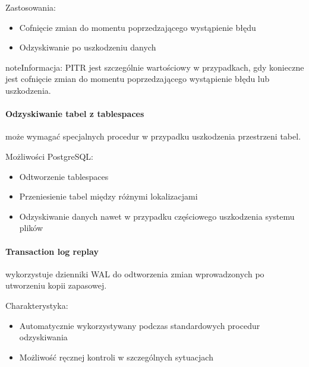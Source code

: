 \documentclass[letterpaper,10pt,polish]{sphinxmanual}
\begin{document}
\sphinxAtStartPar
Zastosowania:
\begin{itemize}
\item {} 
\sphinxAtStartPar
Cofnięcie zmian do momentu poprzedzającego wystąpienie błędu

\item {} 
\sphinxAtStartPar
Odzyskiwanie po uszkodzeniu danych

\end{itemize}

\begin{sphinxadmonition}{note}{Informacja:}
\sphinxAtStartPar
PITR jest szczególnie wartościowy w przypadkach, gdy konieczne jest cofnięcie zmian do momentu poprzedzającego wystąpienie błędu lub uszkodzenia.
\end{sphinxadmonition}


\paragraph{Odzyskiwanie tabel z tablespaces}
\label{\detokenize{rozdzial2/Kopie_zapasowe_i_odzyskiwanie_danych/kopie_zapasowe_i_odzyskiwanie_danych:odzyskiwanie-tabel-z-tablespaces}}
\sphinxAtStartPar
{} może wymagać specjalnych procedur w przypadku uszkodzenia przestrzeni tabel.

\sphinxAtStartPar
Możliwości PostgreSQL:
\begin{itemize}
\item {} 
\sphinxAtStartPar
Odtworzenie tablespaces

\item {} 
\sphinxAtStartPar
Przeniesienie tabel między różnymi lokalizacjami

\item {} 
\sphinxAtStartPar
Odzyskiwanie danych nawet w przypadku częściowego uszkodzenia systemu plików

\end{itemize}


\paragraph{Transaction log replay}
\label{\detokenize{rozdzial2/Kopie_zapasowe_i_odzyskiwanie_danych/kopie_zapasowe_i_odzyskiwanie_danych:transaction-log-replay}}
\sphinxAtStartPar
{} wykorzystuje dzienniki WAL do odtworzenia zmian wprowadzonych po utworzeniu kopii zapasowej.

\sphinxAtStartPar
Charakterystyka:
\begin{itemize}
\item {} 
\sphinxAtStartPar
Automatycznie wykorzystywany podczas standardowych procedur odzyskiwania

\item {} 
\sphinxAtStartPar
Możliwość ręcznej kontroli w szczególnych sytuacjach

\end{itemize}
\end{document}
